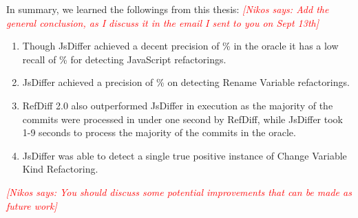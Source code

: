 \documentclass[letterpaper,12pt,onecolumn,final]{report}
\newcommand{\nikos}[1]{\textcolor{red}{{\it [Nikos says: #1]}}}
\begin{document}
In summary, we learned the followings from this thesis:
\nikos{Add the general conclusion, as I discuss it in the email I sent to you on Sept 13th}
\begin{enumerate}
\item Though JsDiffer achieved a decent precision of \oraclePrecision{}\% in the oracle it has a low recall of \oracleRecall{}\%    for detecting JavaScript refactorings. 
\item JsDiffer achieved a precision of \renameVarPrecision{}\% on detecting Rename Variable refactorings.
\item RefDiff 2.0 also outperformed JsDiffer in execution as the majority of the commits were processed in under one second by RefDiff, while JsDiffer took 1-9 seconds to process the majority of the commits in the oracle.
\item JsDiffer was able to detect a single true positive instance of Change Variable Kind Refactoring.
\end{enumerate}
\nikos{You should discuss some potential improvements that can be made as future work}

\clearpage
{}
{}  %
\singlespacing %





\appendix
\setcounter{table}{0}		%
\setcounter{figure}{0}		%
\renewcommand{\thefigure}{\Alph{chapter}.\arabic{figure}} 	%
\renewcommand{\thetable}{\Alph{chapter}.\arabic{table}}		%
\end{document}
